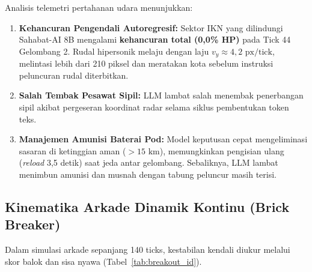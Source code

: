 \documentclass[journal,compsoc]{IEEEtran}
\begin{document}
Analisis telemetri pertahanan udara menunjukkan:
\begin{enumerate}
    \item \textbf{Kehancuran Pengendali Autoregresif:} Sektor IKN yang dilindungi Sahabat-AI 8B mengalami \textbf{kehancuran total (0,0\% HP)} pada Tick 44 Gelombang 2. Rudal hipersonik melaju dengan laju $v_y \approx 4,2 \text{ px/tick}$, melintasi lebih dari 210 piksel dan meratakan kota sebelum instruksi peluncuran rudal diterbitkan.
    \item \textbf{Salah Tembak Pesawat Sipil:} LLM lambat salah menembak penerbangan sipil akibat pergeseran koordinat radar selama siklus pembentukan token teks.
    \item \textbf{Manajemen Amunisi Baterai Pod:} Model keputusan cepat mengeliminasi sasaran di ketinggian aman ($>15 \text{ km}$), memungkinkan pengisian ulang (\textit{reload} 3,5 detik) saat jeda antar gelombang. Sebaliknya, LLM lambat menimbun amunisi dan musnah dengan tabung peluncur masih terisi.
\end{enumerate}

\subsection{Kinematika Arkade Dinamik Kontinu (Brick Breaker)}
Dalam simulasi arkade sepanjang 140 ticks, kestabilan kendali diukur melalui skor balok dan sisa nyawa (Tabel~\ref{tab:breakout_id}).

\begin{table}[t]
\centering
\caption{Kinerja Kendali Kinematika Kontinu (Brick Breaker)}
\label{tab:breakout_id}
\end{table}
\end{document}

